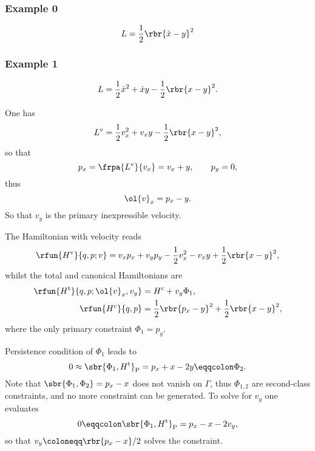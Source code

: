 \documentclass[a4paper,11pt]{article}
\begin{document}
\subsubsection*{Example 0}
\cite[sec.\ 1.2]{Gitman1990}
\begin{equation}
L = \frac{1}{2}\rbr{\dot{x}-y}^2
\end{equation}


\subsubsection*{Example 1}
\begin{equation}
L = \frac{1}{2} \dot{x}^2 + \dot{x} y - \frac{1}{2}\rbr{x-y}^2.
\end{equation}

One has
\begin{equation}
L^\text{v} = \frac{1}{2} v_x^2 + v_x y - \frac{1}{2} \rbr{x-y}^2,
\end{equation}
so that
\begin{equation}
p_x = \frpa{L^\text{v}}{v_x} = v_x + y, \qquad p_y = 0,
\end{equation}
thus
\begin{equation}
\ol{v}_x = p_x - y.
\end{equation}
So that $v_y$ is the primary inexpressible velocity.

The Hamiltonian with velocity reads
\begin{equation}
\rfun{H^\text{v}}{q, p; v} = v_x p_x + v_y p_y - \frac{1}{2} v_x^2 - v_x y 
+ \frac{1}{2}\rbr{x-y}^2,
\end{equation}
whilst the total and canonical Hamiltonians are
\begin{align}
\rfun{H^\text{t}}{q, p; \ol{v}_x, v_y} &= H^\text{c} + v_y \Phi_1,\\
\rfun{H^\text{c}}{q, p} &= \frac{1}{2}\rbr{p_x - y}^2 + \frac{1}{2} \rbr{x-y}^2,
\end{align}
where the only primary constraint $\Phi_1 = p_y$.

Persistence condition of $\Phi_1$ leads to
\begin{equation}
0 \approx \sbr{\Phi_1, H^\text{t}}_\text{P} = p_x + x - 2y \eqqcolon \Phi_2.
\end{equation}
Note that $\sbr{\Phi_1, \Phi_2} = p_x - x$ does not vanish on $\Gamma$, thus 
$\Phi_{1,2}$ are second-class constraints, and no more constraint can be 
generated. To solve for $v_y$ one evaluates
\begin{equation}
0 \eqqcolon \sbr{\Phi_1, H^\text{t}}_\text{P} = p_x - x - 2v_y,
\end{equation}
so that $v_y \coloneqq \rbr{p_x - x}/2$ solves the constraint.
\end{document}
